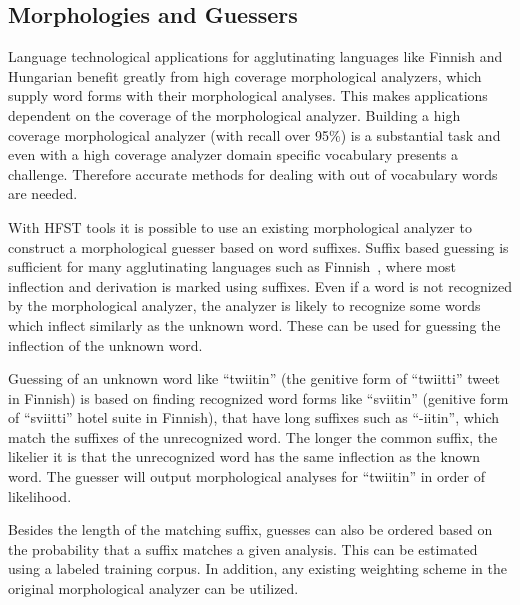 \documentclass{llncs}
\begin{document}

\subsection{Morphologies and Guessers}
\label{sec: morph-guessers}

Language technological applications for agglutinating languages like
Finnish and Hungarian benefit greatly from high coverage morphological
analyzers, which supply word forms with their morphological
analyses. This makes applications dependent on the coverage of the
morphological analyzer. Building a high coverage morphological
analyzer (with recall over 95\%) is a substantial task and even with a
high coverage analyzer domain specific vocabulary presents a
challenge. Therefore accurate methods for dealing with out of
vocabulary words are needed.

With HFST tools it is possible to use an existing morphological
analyzer to construct a morphological guesser based on word
suffixes. Suffix based guessing is sufficient for many agglutinating
languages such as Finnish~\cite{linden/2009/nodalida}, where most
inflection and derivation is marked using suffixes. Even if a word is
not recognized by the morphological analyzer, the analyzer is likely
to recognize some words which inflect similarly as the unknown
word. These can be used for guessing the inflection of the unknown
word.

Guessing of an unknown word like ``twiitin'' (the genitive form of
``twiitti'' tweet in Finnish) is based on finding recognized word
forms like ``sviitin'' (genitive form of ``sviitti'' hotel suite in
Finnish), that have long suffixes such as ``-iitin'', which match the
suffixes of the unrecognized word. The longer the common suffix, the
likelier it is that the unrecognized word has the same inflection as
the known word. The guesser will output morphological analyses for
``twiitin'' in order of likelihood.

Besides the length of the matching suffix, guesses can also be ordered
based on the probability that a suffix matches a given analysis. This
can be estimated using a labeled training corpus. In addition, any
existing weighting scheme in the original morphological analyzer can
be utilized.
\end{document}
